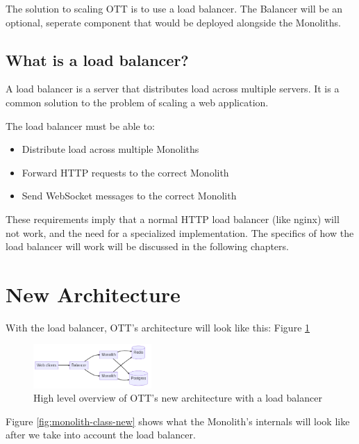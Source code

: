 The solution to scaling OTT is to use a load balancer. The Balancer will be an optional, seperate component that would be deployed alongside the Monoliths.

\subsection{What is a load balancer?}

A load balancer is a server that distributes load across multiple servers. It is a common solution to the problem of scaling a web application.

The load balancer must be able to:
\begin{itemize}
  \item Distribute load across multiple Monoliths
  \item Forward HTTP requests to the correct Monolith
  \item Send WebSocket messages to the correct Monolith
\end{itemize}

These requirements imply that a normal HTTP load balancer (like nginx) will not work, and the need for a specialized implementation. The specifics of how the load balancer will work will be discussed in the following chapters.

\section{New Architecture}

With the load balancer, OTT's architecture will look like this: Figure \ref{fig:ott-architecture-with-load-balancer}

\begin{figure}[!h]
  \centering
  \includegraphics[width=0.4\textwidth]{Figures/ott-architecture-with-load-balancer.png}
  \caption{High level overview of OTT's new architecture with a load balancer}
  \label{fig:ott-architecture-with-load-balancer}
\end{figure}

Figure \ref{fig:monolith-class-new} shows what the Monolith's internals will look like after we take into account the load balancer.

